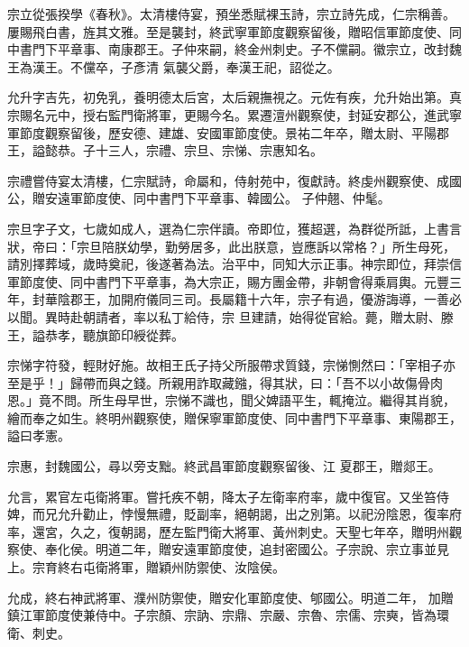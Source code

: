 \begin{pinyinscope}
 宗立從張揆學《春秋》。太清樓侍宴，預坐悉賦裸玉詩，宗立詩先成，仁宗稱善。屢賜飛白書，旌其文雅。至是襲封，終武寧軍節度觀察留後，贈昭信軍節度使、同中書門下平章事、南康郡王。子仲來嗣，終金州刺史。子不儻嗣。徽宗立，改封魏王為漢王。不儻卒，子彥清
 氣襲父爵，奉漢王祀，詔從之。



 允升字吉先，初免乳，養明德太后宮，太后親撫視之。元佐有疾，允升始出第。真宗賜名元中，授右監門衛將軍，更賜今名。累遷澶州觀察使，封延安郡公，進武寧軍節度觀察留後，歷安德、建雄、安國軍節度使。景祐二年卒，贈太尉、平陽郡王，謚懿恭。子十三人，宗禮、宗旦、宗悌、宗惠知名。



 宗禮嘗侍宴太清樓，仁宗賦詩，命屬和，侍射苑中，復獻詩。終虔州觀察使、成國公，贈安遠軍節度使、同中書門下平章事、韓國公。
 子仲翹、仲髦。



 宗旦字子文，七歲如成人，選為仁宗伴讀。帝即位，獲超選，為群從所詆，上書言狀，帝曰：「宗旦陪朕幼學，勤勞居多，此出朕意，豈應訴以常格？」所生母死，請別擇葬域，歲時奠祀，後遂著為法。治平中，同知大示正事。神宗即位，拜崇信軍節度使、同中書門下平章事，為大宗正，賜方團金帶，非朝會得乘肩輿。元豐三年，封華陰郡王，加開府儀同三司。長屬籍十六年，宗子有過，優游誨導，一善必以聞。異時赴朝請者，率以私丁給侍，宗
 旦建請，始得從官給。薨，贈太尉、滕王，謚恭孝，聽旗節印綬從葬。



 宗悌字符發，輕財好施。故相王氏子持父所服帶求質錢，宗悌惻然曰：「宰相子亦至是乎！」歸帶而與之錢。所親用詐取藏鏹，得其狀，曰：「吾不以小故傷骨肉恩。」竟不問。所生母早世，宗悌不識也，聞父婢語平生，輒掩泣。繼得其肖貌，繪而奉之如生。終明州觀察使，贈保寧軍節度使、同中書門下平章事、東陽郡王，謚曰孝憲。



 宗惠，封魏國公，尋以旁支黜。終武昌軍節度觀察留後、江
 夏郡王，贈郯王。



 允言，累官左屯衛將軍。嘗托疾不朝，降太子左衛率府率，歲中復官。又坐笞侍婢，而兄允升勸止，悖慢無禮，貶副率，絕朝謁，出之別第。以祀汾陰恩，復率府率，還宮，久之，復朝謁，歷左監門衛大將軍、黃州刺史。天聖七年卒，贈明州觀察使、奉化侯。明道二年，贈安遠軍節度使，追封密國公。子宗說、宗立事並見上。宗育終右屯衛將軍，贈穎州防禦使、汝陰侯。



 允成，終右神武將軍、濮州防禦使，贈安化軍節度使、郇國公。明道二年，
 加贈鎮江軍節度使兼侍中。子宗顏、宗訥、宗鼎、宗嚴、宗魯、宗儒、宗奭，皆為環衛、刺史。




\end{pinyinscope}
